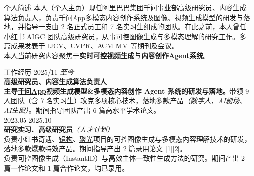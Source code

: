 \documentclass{resume} %
\begin{document}
\vspace{-6pt}

\begin{rSection}{个人简述}
本人（\href{https://jinpeng-yu.github.io/}{个人主页}）现任阿里巴巴集团千问事业部高级研究员、内容生成算法负责人，负责千问App多模态内容创作系统及图像、视频生成模型的研发与落地，并指导一支由 2 名正式员工和 7 名实习生组成的团队。在此之前，本人曾任小红书 AIGC 团队高级研究员，从事可控图像生成与多模态理解的研究工作。多篇成果发表于 IJCV、CVPR、ACM MM 等期刊及会议。\\
本人当前研究内容聚焦于\textbf{实时可控视频生成}与\textbf{内容创作Agent系统}。
\end{rSection}

\vspace{-6pt}

\begin{rSection}{工作经历}
\hspace*{-1.5em}{\bf 阿里巴巴集团｜千问事业部} \hfill 2025/11-{\em 至今} \\
{\bf 高级研究员、内容生成算法负责人} \\
\textbf{主导\href{https://www.qianwen.com/}{千问App}视频生成模型\&多模态内容创作 Agent 系统的研发与落地。}带领 9 人团队（含 7 名实习生）攻克多项核心技术，落地多款产品{\em（数字人、AI剧场、AI生图）}。期间指导团队产出 6 篇高水平学术论文。\\[0.4em]
\hspace*{-1.5em}{\bf 小红书｜智能创作组} \hfill 2023.05-2025.10 \\
{\bf 研究实习、高级研究员}{\em（人才计划）} \\
负责小红书奇遇、\href{https://www.53ai.com/news/neirongchuangzuo/2024090686590.html}{镜构}、\href{https://ad.xiaohongshu.com/}{聚光}项目的可控图像生成与多模态内容理解技术的研发，落地多款爆款特效产品。期间指导产出 2 篇录用论文 \href{https://dl.acm.org/doi/10.1145/3805622.3810729}{[1]}\href{https://arxiv.org/pdf/2603.29469}{[2]}。\\[0.4em]
负责可控图像生成（InstantID）与高效主体一致性生成方法的研究。期间产出 2 篇一作论文和 1 篇合作论文，均已录用。
\end{rSection}
\end{document}
